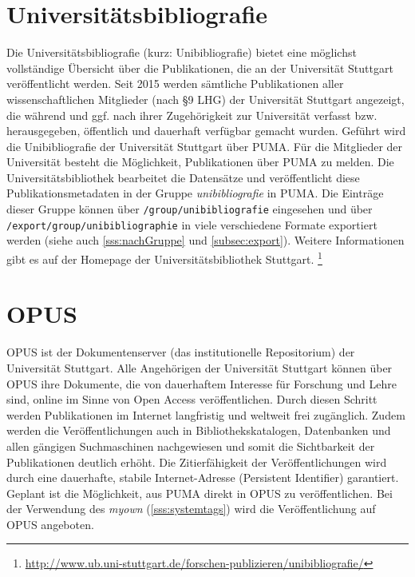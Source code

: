 \section{Universitätsbibliografie}
\label{sec:unibibliografie}
Die Universitätsbibliografie (kurz: Unibibliografie) bietet eine möglichst vollständige Übersicht über die Publikationen, die an der Universität Stuttgart veröffentlicht werden. Seit 2015 werden sämtliche Publikationen aller wissenschaftlichen Mitglieder (nach §9 LHG) der Universität Stuttgart angezeigt, die während und ggf. nach ihrer Zugehörigkeit zur Universität verfasst bzw. herausgegeben, öffentlich und dauerhaft verfügbar gemacht wurden.\newline\newline
Geführt wird die Unibibliografie der Universität Stuttgart über PUMA. Für die Mitglieder der Universität besteht die Möglichkeit, Publikationen über PUMA zu melden. Die Universitätsbibliothek bearbeitet die Datensätze und veröffentlicht diese Publikationsmetadaten in der Gruppe \textit{unibibliografie} in PUMA. Die Einträge dieser Gruppe können über \texttt{/group/unibibliografie} eingesehen und über \texttt{/export/group/unibibliographie} in viele verschiedene Formate exportiert werden (siehe auch \autoref{sss:nachGruppe} und \autoref{subsec:export}). Weitere Informationen gibt es auf der Homepage der Universitätsbibliothek Stuttgart. \footnote{\url{http://www.ub.uni-stuttgart.de/forschen-publizieren/unibibliografie/}}
\section{OPUS}
\label{sec:opus}
OPUS ist der Dokumentenserver (das institutionelle Repositorium) der Universität Stuttgart. Alle Angehörigen der Universität Stuttgart können über OPUS ihre Dokumente, die von dauerhaftem Interesse für Forschung und Lehre sind, online im Sinne von Open Access veröffentlichen. Durch diesen Schritt werden Publikationen im Internet langfristig und weltweit frei zugänglich. Zudem werden die Veröffentlichungen auch in Bibliothekskatalogen, Datenbanken und allen gängigen Suchmaschinen nachgewiesen und somit die Sichtbarkeit der Publikationen deutlich erhöht. Die Zitierfähigkeit der Veröffentlichungen wird durch eine dauerhafte, stabile Internet-Adresse (Persistent Identifier) garantiert.
\newline\newline
Geplant ist die Möglichkeit, aus PUMA direkt in OPUS zu veröffentlichen. Bei der Verwendung des \tags \textit{myown} (\autoref{sss:systemtags}) wird die Veröffentlichung auf OPUS angeboten.  

